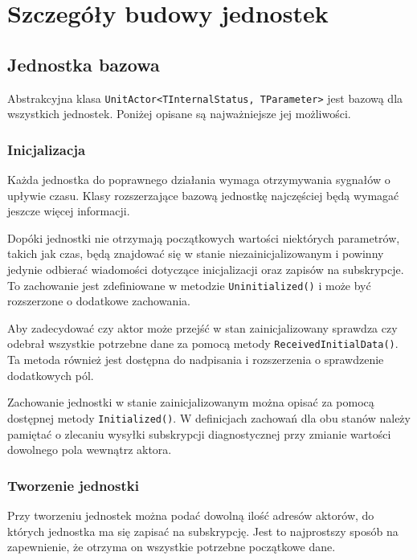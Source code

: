 \chapter{Szczegóły budowy jednostek} \label{ch:unit}

\section{Jednostka bazowa}
Abstrakcyjna klasa \lstinline{UnitActor<TInternalStatus, TParameter>} jest bazową dla wszystkich jednostek. Poniżej opisane są najważniejsze jej możliwości.

\subsection*{Inicjalizacja} \label{subsec:unitInitialization}
Każda jednostka do poprawnego działania wymaga otrzymywania sygnałów o upływie czasu. Klasy rozszerzające bazową jednostkę najczęściej będą wymagać jeszcze więcej informacji. 

Dopóki jednostki nie otrzymają początkowych wartości niektórych parametrów, takich jak czas, będą znajdować się w stanie niezainicjalizowanym i powinny jedynie odbierać wiadomości dotyczące inicjalizacji oraz zapisów na subskrypcje.
To zachowanie jest zdefiniowane w metodzie \lstinline{Uninitialized()} i może być rozszerzone o dodatkowe zachowania.

Aby zadecydować czy aktor może przejść w stan zainicjalizowany sprawdza czy odebrał wszystkie potrzebne dane za pomocą metody \lstinline{ReceivedInitialData()}. Ta metoda również jest dostępna do nadpisania i rozszerzenia o sprawdzenie dodatkowych pól.

Zachowanie jednostki w stanie zainicjalizowanym można opisać za pomocą dostępnej metody \lstinline{Initialized()}. 
W definicjach zachowań dla obu stanów należy pamiętać o zlecaniu wysyłki subskrypcji diagnostycznej przy zmianie wartości dowolnego pola wewnątrz aktora.

\subsection*{Tworzenie jednostki}
Przy tworzeniu jednostek można podać dowolną ilość adresów aktorów, do których jednostka ma się zapisać na subskrypcję. Jest to najprostszy sposób na zapewnienie, że otrzyma on wszystkie potrzebne początkowe dane. 

